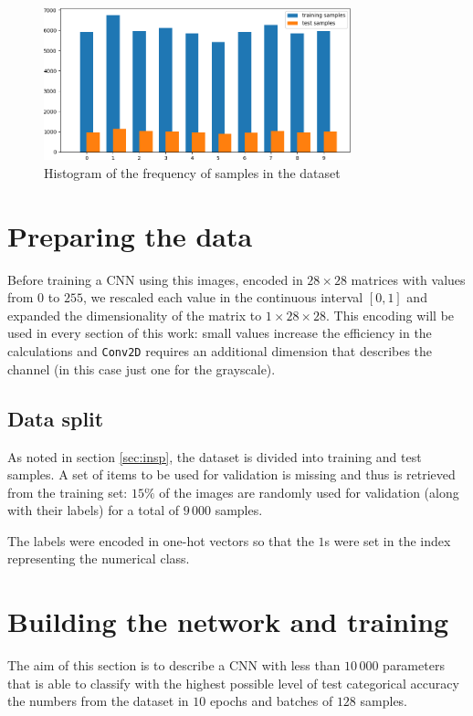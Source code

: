 \documentclass[compsoc]{IEEEtran}
\begin{document}
\begin{figure}[ht!]
\centering                                                                        
\includegraphics[width=3.5in]{hist.png}
\captionsetup{justification=centering}                                                                                         
\caption{Histogram of the frequency of samples in the dataset}
\label{fig:hist}                                                                                                                               
\end{figure}

\section{Preparing the data}
Before training a CNN using this images, encoded in $28\times28$ matrices with values from $0$ to $255$, we rescaled each value in the continuous interval $[0, 1]$ and expanded the dimensionality of the matrix to $1 \times 28 \times 28$. This encoding will be used in every section of this work: small values increase the efficiency in the calculations and \texttt{Conv2D} requires an additional dimension that describes the channel (in this case just one for the grayscale).


\subsection{Data split}
As noted in section \ref{sec:insp}, the dataset is divided into training and test samples. A set of items to be used for validation is missing and thus
is retrieved from the training set: $15\%$ of the images are randomly used for validation (along with their labels) for a total of $9\,000$ samples. \par
The labels were encoded in one-hot vectors so that the $1$s were set in the index representing the numerical class. \par

\section{Building the network and training}
The aim of this section is to describe a CNN with less than $10\,000$ parameters that is able to classify
with the highest possible level of test categorical accuracy the numbers from the dataset in $10$ epochs and batches of $128$ samples. 
\end{document}

